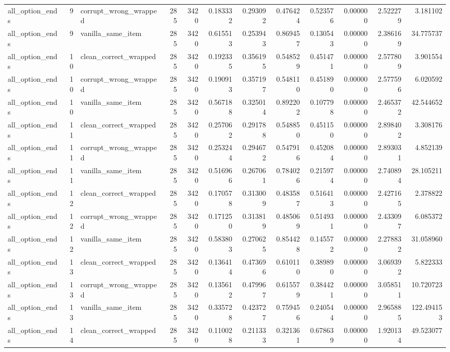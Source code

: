 \begin{tabular}{lrlrrrrrrrrr}
all\_option\_ends & 9 & corrupt\_wrong\_wrapped & 285 & 3420 & 0.183332 & 0.293092 & 0.476424 & 0.523576 & 0.000000 & 2.522279 & 3.181102 \\
all\_option\_ends & 9 & vanilla\_same\_item & 285 & 3420 & 0.615513 & 0.253943 & 0.869457 & 0.130543 & 0.000000 & 2.386169 & 34.775737 \\
all\_option\_ends & 10 & clean\_correct\_wrapped & 285 & 3420 & 0.192335 & 0.356195 & 0.548529 & 0.451471 & 0.000000 & 2.577809 & 3.901554 \\
all\_option\_ends & 10 & corrupt\_wrong\_wrapped & 285 & 3420 & 0.190913 & 0.357197 & 0.548110 & 0.451890 & 0.000000 & 2.577596 & 6.020592 \\
all\_option\_ends & 10 & vanilla\_same\_item & 285 & 3420 & 0.567188 & 0.325014 & 0.892202 & 0.107798 & 0.000000 & 2.465372 & 42.544652 \\
all\_option\_ends & 11 & clean\_correct\_wrapped & 285 & 3420 & 0.257062 & 0.291788 & 0.548850 & 0.451150 & 0.000000 & 2.898402 & 3.308176 \\
all\_option\_ends & 11 & corrupt\_wrong\_wrapped & 285 & 3420 & 0.253244 & 0.294672 & 0.547916 & 0.452084 & 0.000000 & 2.893031 & 4.852139 \\
all\_option\_ends & 11 & vanilla\_same\_item & 285 & 3420 & 0.516966 & 0.267061 & 0.784026 & 0.215974 & 0.000000 & 2.740894 & 28.105211 \\
all\_option\_ends & 12 & clean\_correct\_wrapped & 285 & 3420 & 0.170578 & 0.313009 & 0.483587 & 0.516413 & 0.000000 & 2.427165 & 2.378822 \\
all\_option\_ends & 12 & corrupt\_wrong\_wrapped & 285 & 3420 & 0.171250 & 0.313819 & 0.485069 & 0.514931 & 0.000000 & 2.433097 & 6.085372 \\
all\_option\_ends & 12 & vanilla\_same\_item & 285 & 3420 & 0.583803 & 0.270625 & 0.854428 & 0.145572 & 0.000000 & 2.278832 & 31.058960 \\
all\_option\_ends & 13 & clean\_correct\_wrapped & 285 & 3420 & 0.136414 & 0.473696 & 0.610110 & 0.389890 & 0.000000 & 3.069392 & 5.822333 \\
all\_option\_ends & 13 & corrupt\_wrong\_wrapped & 285 & 3420 & 0.135612 & 0.479967 & 0.615579 & 0.384421 & 0.000000 & 3.058511 & 10.720723 \\
all\_option\_ends & 13 & vanilla\_same\_item & 285 & 3420 & 0.335728 & 0.423727 & 0.759456 & 0.240544 & 0.000000 & 2.965885 & 122.494153 \\
all\_option\_ends & 14 & clean\_correct\_wrapped & 285 & 3420 & 0.110028 & 0.211333 & 0.321361 & 0.678639 & 0.000000 & 1.920134 & 49.523077 \\

\end{tabular}
